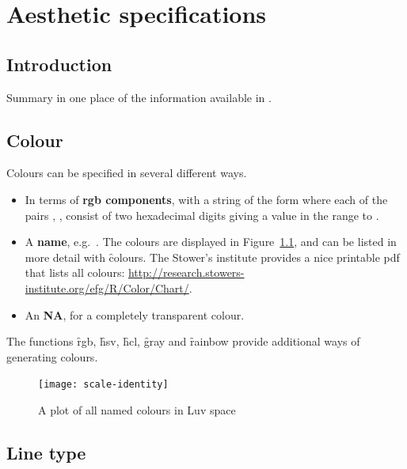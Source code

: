 

\chapter{Aesthetic specifications}
\label{cha:aesthetic_specifications}

\section{Introduction}

Summary in one place of the information available in .

\section{Colour}
\label{sec:colour_spec}

Colours can be specified in several different ways. 

\begin{itemize}
  \item In terms of {\bf rgb components}, with a string of the form  where each of the pairs , ,  consist of two hexadecimal digits giving a value in the range  to . 

  \item A {\bf name}, e.g.\ . The colours are displayed in Figure~\ref{fig:colours}, and can be listed in more detail with \f{colours}. The Stower's institute provides a nice printable pdf that lists all colours:  \url{http://research.stowers-institute.org/efg/R/Color/Chart/}.
    
  \item An {\bf NA}, for a completely transparent colour.  
\end{itemize}

The functions \f{rgb}, \f{hsv}, \f{hcl}, \f{gray} and \f{rainbow} provide additional ways of generating colours.

\begin{figure}[htbp]
  \centering
    \texttt{[image: scale-identity]}
  \caption{A plot of all named colours in Luv space}
  \label{fig:colours}
\end{figure}


\section{Line type}
\label{sec:line_type_spec}

